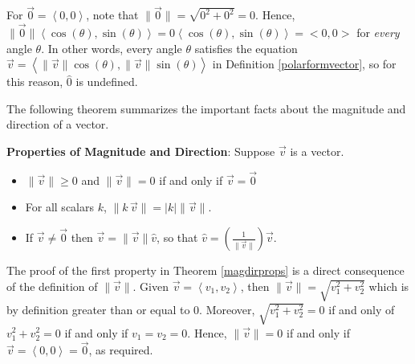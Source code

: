 \documentclass{ximera}
\begin{document}
 

For $\overrightarrow{0} = \left< 0, 0 \right>$, note that  $\| \overrightarrow{0} \| = \sqrt{0^2 + 0^2} = 0$.  Hence, $\| \overrightarrow{0} \|  \left< \cos(\theta), \sin(\theta) \right> = 0 \left< \cos(\theta), \sin(\theta) \right>  = <0,0>$ for \textit{every} angle $\theta$.  In other words, every angle $\theta$ satisfies the equation $\overrightarrow{v} =  \left< \| \overrightarrow{v} \| \cos(\theta), \| \overrightarrow{v} \| \sin(\theta) \right>$  in  Definition \ref{polarformvector}, so for this reason,  $\hat{0}$ is undefined. 

 

The following theorem summarizes the important facts about the magnitude and direction of a vector.

 


\begin{theorem}  \label{magdirprops}  \textbf{Properties of Magnitude and Direction}: Suppose $\overrightarrow{v}$ is a vector.  

\begin{itemize}

\item $\| \overrightarrow{v} \| \geq 0$ and $\| \overrightarrow{v} \| = 0$ if and only if $\overrightarrow{v} = \overrightarrow{0}$

\item  For all scalars $k$,  $\| k \, \overrightarrow{v} \| = |k| \| \overrightarrow{v} \|$.

\item  If $\overrightarrow{v} \neq \overrightarrow{0}$ then $\overrightarrow{v} = \| \overrightarrow{v} \| \hat{v}$, so that $\hat{v} = \left(\frac{1}{\|\overrightarrow{v}\|}\right) \overrightarrow{v}$.

\end{itemize}

\end{theorem}

 


 

The proof of the first property in Theorem \ref{magdirprops} is a direct consequence of the definition of $\| \overrightarrow{v} \|$.  Given $\overrightarrow{v}  = \left< v_1 ,v_2\right>$, then $\| \overrightarrow{v} \| = \sqrt{v_1^2 + v_2^2}$ which is by definition greater than or equal to $0$.  Moreover, $\sqrt{v_1^2 + v_2^2} = 0$ if and only of $v_1^2 + v_2^2 = 0$ if and only if $v_1 = v_2 = 0$.  Hence, $\| \overrightarrow{v} \| = 0$ if and only if $\overrightarrow{v} = \left<0,0\right> =  \overrightarrow{0}$, as required.
\end{document}
